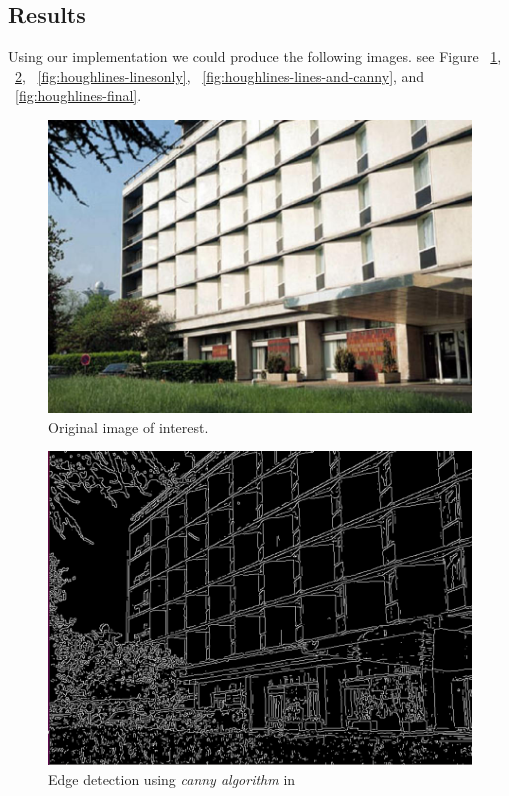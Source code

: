 \documentclass[journal,9pt,onecolumn,draftclsnofoot]{ieeeconf} %
\begin{document}
\subsection*{Results}
Using our implementation we could produce the following images. see Figure ~\ref{fig:houghlines-origianl}, ~\ref{fig:houghlines-canny}, ~\ref{fig:houghlines-linesonly}, ~\ref{fig:houghlines-lines-and-canny}, and ~\ref{fig:houghlines-final}.
\begin{figure}[h!]
\includegraphics[width=0.4\paperwidth]{hough-lines/lines.jpg}
\caption{Original image of interest.}
\label{fig:houghlines-origianl}
\end{figure}

\begin{figure}[h!]
\includegraphics[width=0.4\paperwidth]{hough-lines/canny-image.jpg}
\caption{Edge detection using \textit{canny algorithm} in ~}
\label{fig:houghlines-canny}
\end{figure}
\end{document}
